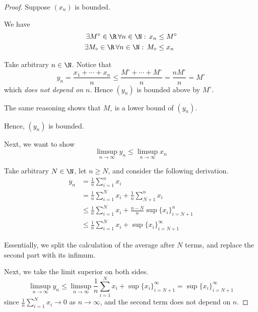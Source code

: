 \documentclass[11pt,letterpaper]{article}
\begin{document}
\begin{proof}
  Suppose $(x_n)$ is bounded.

  We have
  \begin{align}
    \exists M^\circ \in \R\, \forall n \in \N:\, x_n &\leq M^\circ
    \label{eq:xn-bounded-above} \\
    \exists M_\circ \in \R\, \forall n \in \N:\, M_\circ &\leq x_n
    \label{eq:xn-bounded-below}
  \end{align}

  Take arbitrary $n \in \N$. Notice that
  \begin{equation*}
    y_n
    = \frac{x_1 + \cdots + x_n}{n}
    \leq \frac{M^\circ + \cdots + M^\circ}{n}
    = \frac{n M^\circ}{n}
    = M^\circ
  \end{equation*}
  which \emph{does not depend on $n$}. Hence $(y_n)$ is bounded above by
  $M^\circ$.

  The same reasoning shows that $M_\circ$ is a lower bound of $(y_n)$.

  Hence, $(y_n)$ is bounded.

  Next, we want to show
  \begin{equation}
    \limsup_{n\to\infty}{y_n}
    \leq
    \limsup_{n\to\infty}{x_n}
  \end{equation}

  Take arbitrary $N \in \N$, let $n \geq N$, and consider the following
  derivation.
  \begin{align*}
    y_n
    &= \frac{1}{n} \sum_{i=1}^n {x_i} \\
    &= \frac{1}{n} \sum_{i=1}^N {x_i}
      + \frac{1}{n} \sum_{N+1}^n {x_i} \\
    &\leq \frac{1}{n} \sum_{i=1}^N {x_i}
      + \frac{n-N}{n} \sup \{x_i\}_{i=N+1}^n \\
    &\leq \frac{1}{n} \sum_{i=1}^N {x_i}
      + \sup \{x_i\}_{i=N+1}^\infty
  \end{align*}

  Essentially, we split the calculation of the average after $N$ terms, and
  replace the second part with its infimum.

  Next, we take the limit superior on both sides.
  \begin{equation*}
    \limsup_{n\to\infty} {y_n}
    \leq \limsup_{n\to\infty} {
      \frac{1}{n} \sum_{i=1}^N {x_i} + \sup \{x_i\}_{i=N+1}^\infty
    }
    = \sup \{x_i\}_{i=N+1}^\infty
  \end{equation*}
  since $\frac{1}{n} \sum_{i=1}^N {x_i} \to 0$ as $n \to \infty$, and the
  second term does not depend on $n$.


\end{proof}
\end{document}
